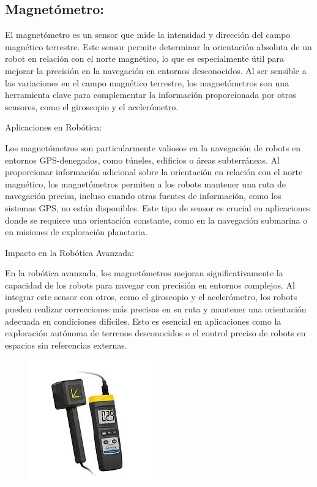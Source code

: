 \subsection{\textbf{Magnetómetro}:}

El magnetómetro es un sensor que mide la intensidad y dirección del campo magnético terrestre. Este sensor permite determinar la orientación absoluta de un robot en relación con el norte magnético, lo que es especialmente útil para mejorar la precisión en la navegación en entornos desconocidos. Al ser sensible a las variaciones en el campo magnético terrestre, los magnetómetros son una herramienta clave para complementar la información proporcionada por otros sensores, como el giroscopio y el acelerómetro.



Aplicaciones en Robótica:


Los magnetómetros son particularmente valiosos en la navegación de robots en entornos GPS-denegados, como túneles, edificios o áreas subterráneas. Al proporcionar información adicional sobre la orientación en relación con el norte magnético, los magnetómetros permiten a los robots mantener una ruta de navegación precisa, incluso cuando otras fuentes de información, como los sistemas GPS, no están disponibles. Este tipo de sensor es crucial en aplicaciones donde se requiere una orientación constante, como en la navegación submarina o en misiones de exploración planetaria.


Impacto en la Robótica Avanzada:


En la robótica avanzada, los magnetómetros mejoran significativamente la capacidad de los robots para navegar con precisión en entornos complejos. Al integrar este sensor con otros, como el giroscopio y el acelerómetro, los robots pueden realizar correcciones más precisas en su ruta y mantener una orientación adecuada en condiciones difíciles. Esto es esencial en aplicaciones como la exploración autónoma de terrenos desconocidos o el control preciso de robots en espacios sin referencias externas.
\begin{figure}[h]
	\centering
	\includegraphics[width=0.3\linewidth]{img/magnetometro}
	\caption{}
	\label{fig:magnetometro}
\end{figure}
